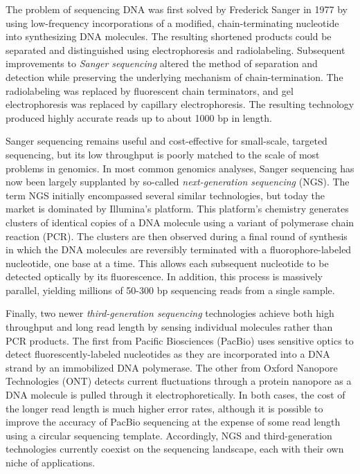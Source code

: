 \documentclass[11pt]{ucthesis}
\begin{document}
The problem of sequencing DNA was first solved by Frederick Sanger in 1977 by using low-frequency incorporations of a modified, chain-terminating nucleotide into synthesizing DNA molecules\cite{sanger1977dna}. The resulting shortened products could be separated and distinguished using electrophoresis and radiolabeling. Subsequent improvements to \emph{Sanger sequencing} altered the method of separation and detection while preserving the underlying mechanism of chain-termination. The radiolabeling was replaced by fluorescent chain terminators, and gel electrophoresis was replaced by capillary electrophoresis\cite{smith1986fluorescence}. The resulting technology produced highly accurate reads up to about 1000 bp in length. 
 
Sanger sequencing remains useful and cost-effective for small-scale, targeted sequencing, but its low throughput is poorly matched to the scale of most problems in genomics. In most common genomics analyses, Sanger sequencing has now been largely supplanted by so-called \emph{next-generation sequencing} (NGS)\cite{metzker2010sequencing}. The term NGS initially encompassed several similar technologies, but today the market is dominated by Illumina's platform. This platform's chemistry generates clusters of identical copies of a DNA molecule using a variant of polymerase chain reaction (PCR). The clusters are then observed during a final round of synthesis in which the DNA molecules are reversibly terminated with a fluorophore-labeled nucleotide, one base at a time. This allows each subsequent nucleotide to be detected optically by its fluorescence. In addition, this process is massively parallel, yielding millions of 50-300 bp sequencing reads from a single sample. 

Finally, two newer \emph{third-generation sequencing} technologies achieve both high throughput and long read length by sensing individual molecules rather than PCR products. The first from Pacific Biosciences (PacBio) uses sensitive optics to detect fluorescently-labeled nucleotides as they are incorporated into a DNA strand by an immobilized DNA polymerase\cite{eid2009real}. The other from Oxford Nanopore Technologies (ONT) detects current fluctuations through a protein nanopore as a DNA molecule is pulled through it electrophoretically\cite{mikheyev2014first}. In both cases, the cost of the longer read length is much higher error rates, although it is possible to improve the accuracy of PacBio sequencing at the expense of some read length using a circular sequencing template\cite{wenger2019accurate}. Accordingly, NGS and third-generation technologies currently coexist on the sequencing landscape, each with their own niche of applications.
 
\end{document}
